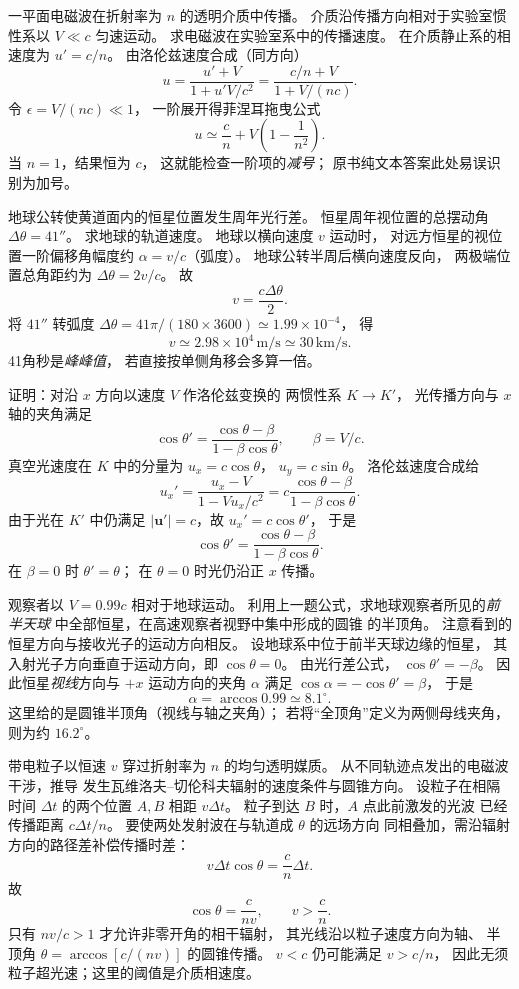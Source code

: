 一平面电磁波在折射率为 $n$ 的透明介质中传播。
介质沿传播方向相对于实验室惯性系以
$V\ll c$ 匀速运动。
求电磁波在实验室系中的传播速度。
\exsolution
在介质静止系的相速度为 $u'=c/n$。
由洛伦兹速度合成（同方向）
\[
 u=\frac{u'+V}{1+u'V/c^2}
 =\boxed{\frac{c/n+V}{1+V/(nc)}}.
\]
令 $\epsilon=V/(nc)\ll1$，
一阶展开得菲涅耳拖曳公式
\[
 \boxed{u\simeq\frac cn+
 V\left(1-\frac1{n^2}\right)}.
\]
\excheck 当 $n=1$，结果恒为 $c$，
这就能检查一阶项的\emph{减号}；
原书纯文本答案此处易误识别为加号。

地球公转使黄道面内的恒星位置发生周年光行差。
恒星周年视位置的总摆动角
$\Delta\theta=41''$。
求地球的轨道速度。
\exsolution
地球以横向速度 $v$ 运动时，
对远方恒星的视位置一阶偏移角幅度约
$\alpha=v/c$（弧度）。
地球公转半周后横向速度反向，
两极端位置总角距约为
$\Delta\theta=2v/c$。
故
\[
 \boxed{v=\frac{c\Delta\theta}{2}}.
\]
将 $41''$ 转弧度
$\Delta\theta=41\pi/(180\times3600)
\simeq1.99\times10^{-4}$，
得
\[
 \boxed{v\simeq2.98\times10^4\,\mathrm{m/s}
 \simeq30\,\mathrm{km/s}}.
\]
\excheck 41角秒是\emph{峰峰值}，
若直接按单侧角移会多算一倍。

证明：对沿 $x$ 方向以速度 $V$ 作洛伦兹变换的
两惯性系 $K\to K'$，
光传播方向与 $x$ 轴的夹角满足
\[
 \cos\theta'=\frac{\cos\theta-\beta}
 {1-\beta\cos\theta},
 \qquad \beta=V/c.
\]
\exsolution
真空光速度在 $K$ 中的分量为
$u_x=c\cos\theta$，
$u_y=c\sin\theta$。
洛伦兹速度合成给
\[
 u_x'=\frac{u_x-V}{1-Vu_x/c^2}
 =c\frac{\cos\theta-\beta}
 {1-\beta\cos\theta}.
\]
由于光在 $K'$ 中仍满足
$|\bm u'|=c$，故 $u_x'=c\cos\theta'$，
于是
\[
 \boxed{\cos\theta'=
 \frac{\cos\theta-\beta}{1-\beta\cos\theta}}.
\]
\excheck 在 $\beta=0$ 时 $\theta'=\theta$；
在 $\theta=0$ 时光仍沿正 $x$ 传播。

观察者以 $V=0.99c$ 相对于地球运动。
利用上一题公式，求地球观察者所见的\emph{前半天球}
中全部恒星，在高速观察者视野中集中形成的圆锥
的半顶角。
\exsolution
注意看到的恒星方向与接收光子的运动方向相反。
设地球系中位于前半天球边缘的恒星，
其入射光子方向垂直于运动方向，即
$\cos\theta=0$。
由光行差公式，
$\cos\theta'=-\beta$。
因此恒星\emph{视线}方向与 $+x$ 运动方向的夹角
$\alpha$ 满足
$\cos\alpha=-\cos\theta'=\beta$，
于是
\[
 \boxed{\alpha=\arccos0.99\simeq8.1^\circ}.
\]
\excheck 这里给的是圆锥半顶角（视线与轴之夹角）；
若将“全顶角”定义为两侧母线夹角，则为约 $16.2^\circ$。

带电粒子以恒速 $v$ 穿过折射率为 $n$ 的均匀透明媒质。
从不同轨迹点发出的电磁波干涉，推导
发生瓦维洛夫--切伦科夫辐射的速度条件与圆锥方向。
\exsolution
设粒子在相隔时间 $\Delta t$ 的两个位置
$A,B$ 相距 $v\Delta t$。
粒子到达 $B$ 时，$A$ 点此前激发的光波
已经传播距离 $c\Delta t/n$。
要使两处发射波在与轨道成 $\theta$ 的远场方向
同相叠加，需沿辐射方向的路径差补偿传播时差：
\[
 v\Delta t\cos\theta=\frac cn\Delta t.
\]
故
\[
 \boxed{\cos\theta=\frac c{nv}},
 \qquad \boxed{v>\frac cn}.
\]
只有 $nv/c>1$ 才允许非零开角的相干辐射，
其光线沿以粒子速度方向为轴、
半顶角 $\theta=\arccos[c/(nv)]$ 的圆锥传播。
\excheck $v<c$ 仍可能满足 $v>c/n$，
因此无须粒子超光速；这里的阈值是介质相速度。

